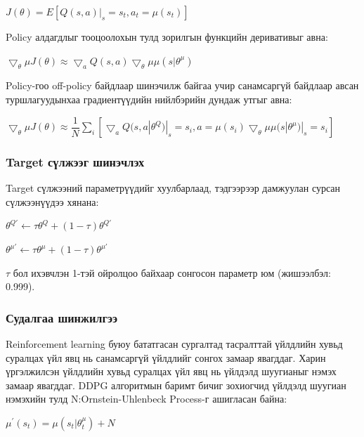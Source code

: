 \documentclass[12pt,A4]{report}
\begin{document}
\begin{center}
$J(\theta) = E[Q(s, a)|_s=s_t,a_t=\mu(s_t)]$
\end{center}

Policy алдагдлыг тооцоолохын тулд зорилгын функцийн деривативыг авна:

\begin{center}
$\bigtriangledown_\theta\mu J(\theta) \approx \bigtriangledown_a Q(s, a)\bigtriangledown_\theta\mu \mu(s|\theta^\mu)$
\end{center}

Policy-гоо off-policy байдлаар шинэчилж байгаа учир санамсаргүй байдлаар авсан туршлагуудынхаа градиентүүдийн нийлбэрийн дундаж утгыг авна:

\begin{center}
$\bigtriangledown_\theta\mu J(\theta) \approx \dfrac{1}{N}\sum_{i}[\bigtriangledown_a Q(s, a|\theta^Q)|_s=s_i,a=\mu(s_i)\bigtriangledown_\theta\mu \mu(s|\theta^\mu)|_s=s_i]$
\end{center}

\subsubsection{Target сүлжээг шинэчлэх}
 
Target сүлжээний параметрүүдийг хуулбарлаад, тэдгээрээр дамжуулан сурсан сүлжээнүүдээ хянана:

\begin{center}
$\theta^{Q{'}} \longleftarrow \tau\theta^Q + (1-\tau)\theta^{Q{'}}$ 

$\theta^{\mu{'}} \longleftarrow \tau\theta^\mu + (1-\tau)\theta^{\mu{'}}$ 

$\tau $ бол ихэвчлэн 1-тэй ойролцоо байхаар сонгосон параметр юм (жишээлбэл: 0.999).
\end{center}

\subsubsection{Судалгаа шинжилгээ}

Reinforcement learning буюу бататгасан сургалтад тасралттай үйлдлийн хувьд суралцах үйл явц нь санамсаргүй үйлдлийг сонгох замаар явагддаг. Харин үргэлжилсэн үйлдлийн хувьд суралцах үйл явц нь үйлдэлд шуугианыг нэмэх замаар явагддаг. DDPG алгоритмын баримт бичиг зохиогчид үйлдэлд шуугиан нэмэхийн тулд N:Ornstein-Uhlenbeck Process-г ашигласан байна:

\begin{center}
$\mu^{'}(s_t) = \mu(s_t|\theta_t^\mu) + N$
\end{center}
\end{document}
